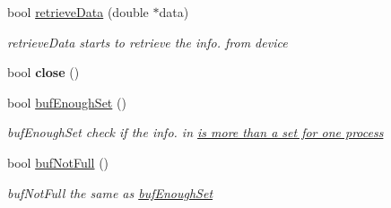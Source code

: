 \begin{DoxyCompactItemize}
\item 
bool \hyperlink{classlrf__controller_a7ffb8af0a1f027853b30769eced05c00}{retrieve\+Data} (double $\ast$data)
\begin{DoxyCompactList}\small\item\em retrieve\+Data starts to retrieve the info. from device \end{DoxyCompactList}\item 
\hypertarget{classlrf__controller_af2b8f2aa951973ee7717e55315cd27e3}{}bool {\bfseries close} ()\label{classlrf__controller_af2b8f2aa951973ee7717e55315cd27e3}

\item 
bool \hyperlink{classlrf__controller_a864a9f00f905ed2f24d2dc8b12566e4a}{buf\+Enough\+Set} ()
\begin{DoxyCompactList}\small\item\em buf\+Enough\+Set check if the info. in \hyperlink{classlrf__controller_a5b3e6126b5bf7eddf5b6fa1c1a555cae}{is more than a set for one process }\end{DoxyCompactList}\item 
bool \hyperlink{classlrf__controller_a677dd52d83706b5b4a1a2eae9298c4c7}{buf\+Not\+Full} ()
\begin{DoxyCompactList}\small\item\em buf\+Not\+Full the same as \hyperlink{classlrf__controller_a864a9f00f905ed2f24d2dc8b12566e4a}{buf\+Enough\+Set}\end{DoxyCompactList}\end{DoxyCompactItemize}
